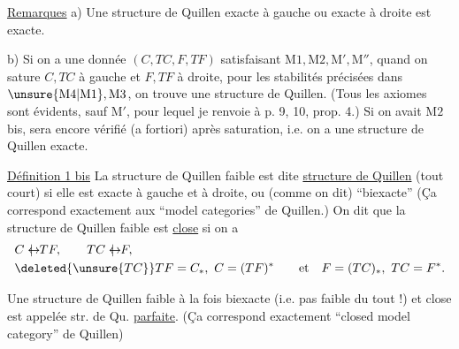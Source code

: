 \uline{Remarques} a) Une structure de Quillen exacte à gauche ou exacte à droite est exacte.

b) Si on a une  donnée $(C,TC,F,TF)$ satisfaisant $\mathrm M1,\mathrm M2,\mathrm M',\mathrm M''$, quand on sature $C,TC$ à gauche et $F,TF$ à droite, pour les stabilités précisées dans $\unsure{\mathrm M4|\mathrm M1},\mathrm M3$, on trouve une structure de Quillen. (Tous les axiomes sont évidents, sauf $\mathrm M'$, pour lequel je renvoie à p. 9, 10,  prop. 4.) Si on avait $\mathrm M2$ bis,  sera encore vérifié (a fortiori) après saturation, i.e. on a une structure de Quillen exacte.

\uline{Définition 1 bis} La structure de Quillen faible est dite \uline{structure de Quillen} (tout court) si elle est exacte à gauche et à droite, ou (comme on dit) ``biexacte''\unsure{;}  (Ça correspond exactement aux ``model categories'' de Quillen.) On dit que la structure de Quillen faible est \uline{close} si on a
\[
\begin{aligned}
&C\mathrel{\leftrightarrow\mkern-15mu\mid\mkern4mu}TF,\qquad TC\mathrel{\leftrightarrow\mkern-15mu\mid\mkern4mu}F,\\
&\deleted{\unsure{TC}}TF=C_{*},\ C=(TF)^{*}\qquad\text{et}\quad F=(TC)_{*},\ TC=F^{*}.
\end{aligned}
\]

Une structure de Quillen faible à la fois biexacte (i.e. pas faible du tout !) et close est appelée str. de Qu. \uline{parfaite}. (Ça correspond exactement   ``closed model category'' de Quillen)
